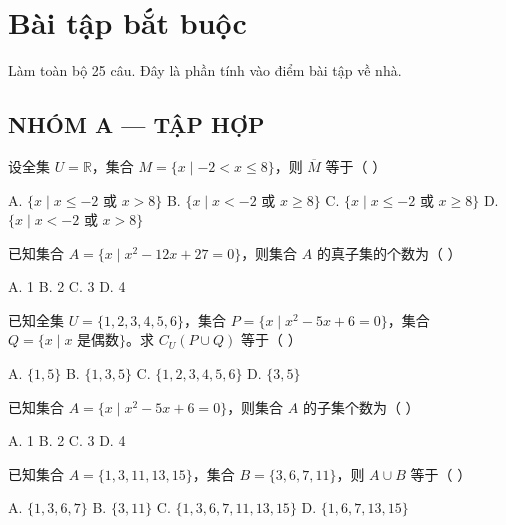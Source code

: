 \documentclass[11pt, a4paper]{article}
\begin{document}

\section{Bài tập bắt buộc}

Làm toàn bộ 25 câu. Đây là phần tính vào điểm bài tập về nhà.

\subsection*{NHÓM A — TẬP HỢP}

\begin{baitap}[1]
设全集 $U=\mathbb{R}$，集合 $M=\{x\mid -2<x\le8\}$，则 $\overline{M}$ 等于（ ）
\par\vspace{3pt}
\noindent A. $\{x\mid x\le-2 \text{ 或 } x>8\}$ \quad B. $\{x\mid x<-2 \text{ 或 } x\ge8\}$ \quad C. $\{x\mid x\le-2 \text{ 或 } x\ge8\}$ \quad D. $\{x\mid x<-2 \text{ 或 } x>8\}$
\end{baitap}

\begin{baitap}[2]
已知集合 $A=\{x\mid x^2-12x+27=0\}$，则集合 $A$ 的真子集的个数为（ ）
\par\vspace{3pt}
\noindent A. 1 \quad B. 2 \quad C. 3 \quad D. 4
\end{baitap}

\begin{baitap}[3]
已知全集 $U=\{1,2,3,4,5,6\}$，集合 $P=\{x\mid x^2-5x+6=0\}$，集合 $Q=\{x\mid x\text{ 是偶数}\}$。求 $C_U(P\cup Q)$ 等于（ ）
\par\vspace{3pt}
\noindent A. $\{1,5\}$ \quad B. $\{1,3,5\}$ \quad C. $\{1,2,3,4,5,6\}$ \quad D. $\{3,5\}$
\end{baitap}

\begin{baitap}[4]
已知集合 $A=\{x\mid x^2-5x+6=0\}$，则集合 $A$ 的子集个数为（ ）
\par\vspace{3pt}
\noindent A. 1 \quad B. 2 \quad C. 3 \quad D. 4
\end{baitap}

\begin{baitap}[5]
已知集合 $A=\{1,3,11,13,15\}$，集合 $B=\{3,6,7,11\}$，则 $A\cup B$ 等于（ ）
\par\vspace{3pt}
\noindent A. $\{1,3,6,7\}$ \quad B. $\{3,11\}$ \quad C. $\{1,3,6,7,11,13,15\}$ \quad D. $\{1,6,7,13,15\}$
\end{baitap}
\end{document}
